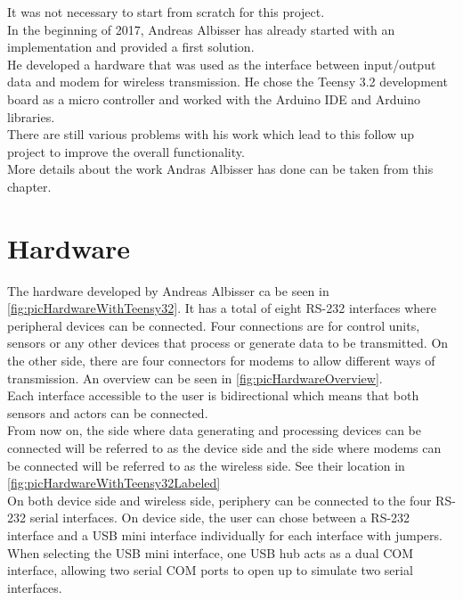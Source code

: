 %
%
It was not necessary to start from scratch for this project. \\
In the beginning of 2017, Andreas Albisser has already started with an implementation and provided a first solution. \\
He developed a hardware that was used as the interface between input/output data and modem for wireless transmission. He chose the Teensy 3.2 development board as a micro controller and worked with the Arduino IDE and Arduino libraries. \\
There are still various problems with his work which lead to this follow up project to improve the overall functionality.\\
More details about the work Andras Albisser has done can be taken from this chapter. \\
%
%
%
\section{Hardware}
%
%
The hardware developed by Andreas Albisser ca be seen in \autoref{fig:picHardwareWithTeensy32}. It has a total of eight RS-232 interfaces where peripheral devices can be connected. Four connections are for control units, sensors or any other devices that process or generate data to be transmitted. On the other side, there are four connectors for modems to allow different ways of transmission. An overview can be seen in \autoref{fig:picHardwareOverview}.\\
%
Each interface accessible to the user is bidirectional which means that both sensors and actors can be connected.\\
From now on, the side where data generating and processing devices can be connected will be referred to as the device side and the side where modems can be connected will be referred to as the wireless side. See their location in \autoref{fig:picHardwareWithTeensy32Labeled}\\
On both device side and wireless side, periphery can be connected to the four RS-232 serial interfaces. On device side, the user can chose between a RS-232 interface and a USB mini interface individually for each interface with jumpers. When selecting the USB mini interface, one USB hub acts as a dual COM interface, allowing two serial COM ports to open up to simulate two serial interfaces. \\
